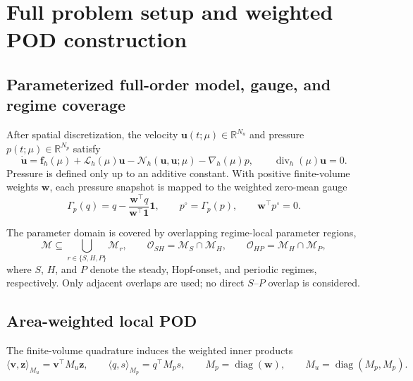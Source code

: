 \section{Full problem setup and weighted POD construction}
\label{app:problem_pod}

\subsection{Parameterized full-order model, gauge, and regime coverage}

After spatial discretization, the velocity
$\bm u(t;\mu)\in\mathbb R^{N_u}$ and pressure
$p(t;\mu)\in\mathbb R^{N_p}$ satisfy
\begin{equation}
    \dot{\bm u}
    =
    \bm f_h(\mu)
    +\mathcal L_h(\mu)\bm u
    -\mathcal N_h(\bm u,\bm u;\mu)
    -\nabla_h(\mu)p,
    \qquad
    \operatorname{div}_h(\mu)\bm u=0.
    \label{eq:app_fom}
\end{equation}
Pressure is defined only up to an additive constant.
With positive finite-volume weights $\bm w$, each pressure snapshot is mapped
to the weighted zero-mean gauge
\begin{equation}
    \Gamma_p(q)
    =
    q-\frac{\bm w^\top q}{\bm w^\top\bm 1}\bm 1,
    \qquad
    p^\circ=\Gamma_p(p),
    \qquad
    \bm w^\top p^\circ=0.
    \label{eq:app_pressure_gauge}
\end{equation}

The parameter domain is covered by overlapping regime-local parameter regions,
\begin{equation}
    \mathcal M
    \subseteq
    \bigcup_{r\in\{S,H,P\}}\mathcal M_r,
    \qquad
    \mathcal O_{SH}
    =
    \mathcal M_S\cap\mathcal M_H,
    \qquad
    \mathcal O_{HP}
    =
    \mathcal M_H\cap\mathcal M_P,
    \label{eq:app_regime_cover}
\end{equation}
where $S$, $H$, and $P$ denote the steady, Hopf-onset, and periodic
regimes, respectively.
Only adjacent overlaps are used; no direct $S$--$P$ overlap is considered.


\subsection{Area-weighted local POD}

The finite-volume quadrature induces the weighted inner products
\begin{equation}
    \langle\bm v,\bm z\rangle_{M_u}
    =
    \bm v^\top M_u\bm z,
    \qquad
    \langle q,s\rangle_{M_p}
    =
    q^\top M_p s,
    \qquad
    M_p=\operatorname{diag}(\bm w),
    \qquad
    M_u=\operatorname{diag}(M_p,M_p).
    \label{eq:app_weighted_inner_products}
\end{equation}


